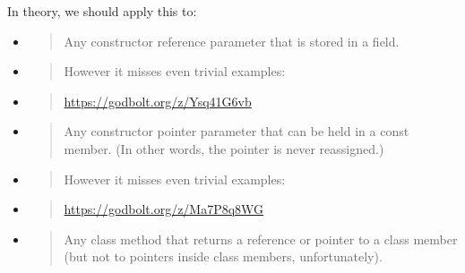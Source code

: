 \documentclass[a4paper,12pt,notitlepage,twoside,openright]{article}
\begin{document}
In theory, we should apply this to:

\begin{itemize}
\item
  \begin{quote}
  Any constructor reference parameter that is stored in a field.
  \end{quote}
\end{itemize}

\begin{itemize}
\item
  \begin{quote}
  However it misses even trivial examples:
  \end{quote}
\end{itemize}

\begin{itemize}
\item
  \begin{quote}
  \href{https://www.google.com/url?q=https://godbolt.org/z/Ysq41G6vb\&sa=D\&source=editors\&ust=1631944129035000\&usg=AOvVaw0Rnch-j0apUhdw0LM5stFJ}{https://godbolt.org/z/Ysq41G6vb}
  \end{quote}
\end{itemize}

\begin{itemize}
\item
  \begin{quote}
  Any constructor pointer parameter that can be held in a const member.
  (In other words, the pointer is never reassigned.)
  \end{quote}
\end{itemize}

\begin{itemize}
\item
  \begin{quote}
  However it misses even trivial examples:
  \end{quote}
\end{itemize}

\begin{itemize}
\item
  \begin{quote}
  \href{https://www.google.com/url?q=https://godbolt.org/z/Ma7P8q8WG\&sa=D\&source=editors\&ust=1631944129036000\&usg=AOvVaw31wGuAGhkcA9WvYkZ-0CG7}{https://godbolt.org/z/Ma7P8q8WG}
  \end{quote}
\end{itemize}

\begin{itemize}
\item
  \begin{quote}
  Any class method that returns a reference or pointer to a class member
  (but not to pointers inside class members, unfortunately).
  \end{quote}
\end{itemize}
\end{document}
